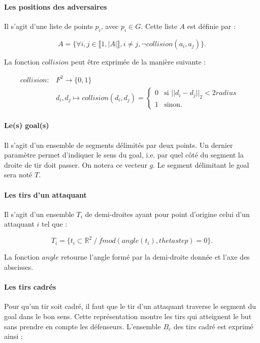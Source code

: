 \documentclass{article}
\begin{document}
\paragraph{Les positions des adversaires} Il s'agit d'une liste de points $p_i$, avec $p_i \in G$. Cette liste $A$ est définie par :

\begin{equation*}
    A = \{ \forall i, j \in \llbracket 1, |A| \rrbracket, i \ne j, \neg collision(a_i, a_j) \}.
\end{equation*}

La fonction $collision$ peut être exprimée de la manière suivante :

\begin{align*}
  collision \colon &F^2 \to \{0, 1 \}\\
  &d_i, d_j \mapsto collision(d_i, d_j) = \begin{cases}
                                   0 & \text{si $|| d_i - d_j ||_2 < 2radius$ } \\
                                   1 & \text{sinon.}
  \end{cases}
\end{align*}

\paragraph{Le(s) goal(s)} Il s'agit d'un ensemble de segments délimités par deux points. Un dernier paramètre permet d'indiquer le sens du goal, i.e. par quel \og côté \fg{} du segment la droite de tir doit passer. On notera ce vecteur $g$. Le segment délimitant le goal sera noté $T$.

\paragraph{Les tirs d'un attaquant} Il s'agit d'un ensemble $T_i$ de demi-droites ayant pour point d'origine celui d'un attaquant $i$ tel que :

\begin{equation*}
    T_i = \{ t_i \subset \mathbb{R}^2 \ / \ fmod(angle(t_i), thetastep) = 0 \}.
\end{equation*}

La fonction $angle$ retourne l'angle formé par la demi-droite donnée et l'axe des abscisses.

\paragraph{Les tirs cadrés}
Pour qu'un tir soit cadré, il faut que le tir d'un attaquant traverse le segment du goal dans le bon sens. Cette représentation montre les tirs qui atteignent le but sans prendre en compte les défenseurs. L'ensemble $B_c$ des tirs cadré est exprimé ainsi :
\end{document}
